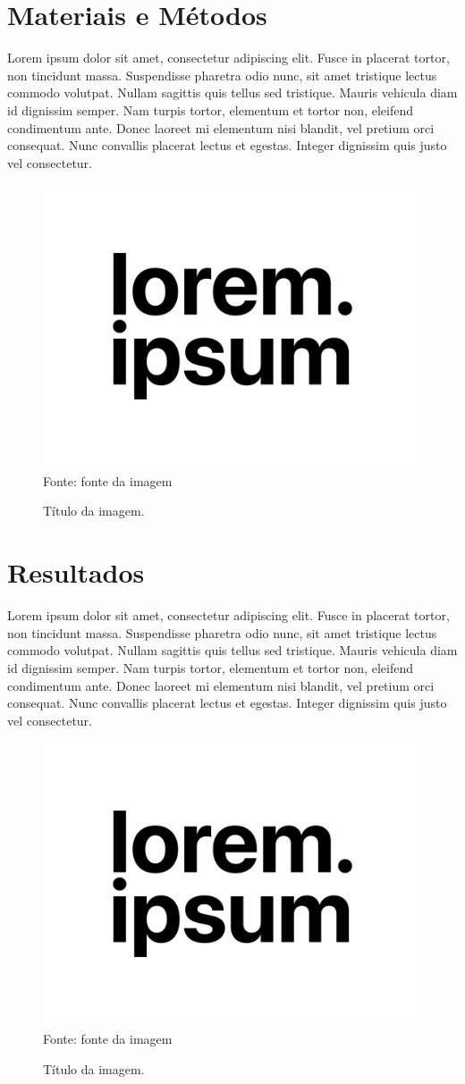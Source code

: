 \documentclass[a4paper, 12pt]{article}
\begin{document}

\section{Materiais e Métodos}

Lorem ipsum dolor sit amet, consectetur adipiscing elit. Fusce in placerat tortor, non tincidunt massa. Suspendisse pharetra odio nunc, sit amet tristique lectus commodo volutpat. Nullam sagittis quis tellus sed tristique. Mauris vehicula diam id dignissim semper. Nam turpis tortor, elementum et tortor non, eleifend condimentum ante. Donec laoreet mi elementum nisi blandit, vel pretium orci consequat. Nunc convallis placerat lectus et egestas. Integer dignissim quis justo vel consectetur.

\begin{figure}[!htb]
    \centering
    \caption{Título da imagem.}
    \includegraphics[width=0.5\linewidth]{imagens/image.png}\\
    {\footnotesize Fonte: fonte da imagem}
    \label{fig:enter-label}
\end{figure}
\newpage
\section{Resultados}
Lorem ipsum dolor sit amet, consectetur adipiscing elit. Fusce in placerat tortor, non tincidunt massa. Suspendisse pharetra odio nunc, sit amet tristique lectus commodo volutpat. Nullam sagittis quis tellus sed tristique. Mauris vehicula diam id dignissim semper. Nam turpis tortor, elementum et tortor non, eleifend condimentum ante. Donec laoreet mi elementum nisi blandit, vel pretium orci consequat. Nunc convallis placerat lectus et egestas. Integer dignissim quis justo vel consectetur.

\begin{figure}[!htb]
    \centering
    \caption{Título da imagem.}
    \includegraphics[width=0.5\linewidth]{imagens/image.png}\\
    {\footnotesize Fonte: fonte da imagem}
    \label{fig:enter-label}
\end{figure}
\newpage
\end{document}
